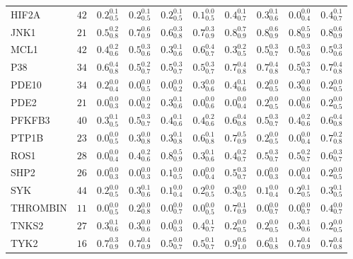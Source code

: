 \begin{tabular}{llllllllll}
HIF2A       &   $42$ &  $0.2^{0.1}_{0.5}$ &  $0.2^{0.1}_{0.5}$ &  $0.2^{0.1}_{0.5}$ &  $0.1^{0.0}_{0.5}$ &  $0.4^{0.1}_{0.7}$ &  $0.3^{0.1}_{0.6}$ &     $0.0^{0.0}_{0.4}$ &  $0.4^{0.1}_{0.7}$ \\
JNK1        &   $21$ &  $0.5^{0.2}_{0.8}$ &  $0.7^{0.6}_{0.9}$ &  $0.6^{0.3}_{0.8}$ &  $0.7^{0.3}_{0.9}$ &  $0.8^{0.7}_{0.9}$ &  $0.8^{0.6}_{0.9}$ &     $0.8^{0.5}_{0.9}$ &  $0.8^{0.6}_{0.9}$ \\
MCL1        &   $42$ &  $0.4^{0.2}_{0.6}$ &  $0.5^{0.3}_{0.6}$ &  $0.3^{0.1}_{0.6}$ &  $0.6^{0.4}_{0.7}$ &  $0.3^{0.2}_{0.5}$ &  $0.5^{0.3}_{0.7}$ &     $0.5^{0.3}_{0.6}$ &  $0.5^{0.3}_{0.6}$ \\
P38         &   $34$ &  $0.6^{0.4}_{0.8}$ &  $0.5^{0.2}_{0.7}$ &  $0.5^{0.3}_{0.7}$ &  $0.5^{0.3}_{0.7}$ &  $0.7^{0.4}_{0.8}$ &  $0.7^{0.4}_{0.8}$ &     $0.5^{0.3}_{0.7}$ &  $0.7^{0.4}_{0.8}$ \\
PDE10       &   $34$ &  $0.2^{0.0}_{0.4}$ &  $0.0^{0.0}_{0.5}$ &  $0.0^{0.0}_{0.2}$ &  $0.3^{0.0}_{0.6}$ &  $0.4^{0.1}_{0.6}$ &  $0.2^{0.0}_{0.5}$ &     $0.3^{0.0}_{0.6}$ &  $0.2^{0.0}_{0.5}$ \\
PDE2        &   $21$ &  $0.0^{0.0}_{0.3}$ &  $0.0^{0.0}_{0.2}$ &  $0.3^{0.1}_{0.6}$ &  $0.0^{0.0}_{0.6}$ &  $0.0^{0.0}_{0.4}$ &  $0.2^{0.0}_{0.5}$ &     $0.0^{0.0}_{0.6}$ &  $0.2^{0.0}_{0.5}$ \\
PFKFB3      &   $40$ &  $0.3^{0.1}_{0.5}$ &  $0.5^{0.3}_{0.7}$ &  $0.4^{0.1}_{0.6}$ &  $0.4^{0.2}_{0.6}$ &  $0.6^{0.4}_{0.8}$ &  $0.5^{0.3}_{0.7}$ &     $0.4^{0.2}_{0.6}$ &  $0.6^{0.4}_{0.8}$ \\
PTP1B       &   $23$ &  $0.0^{0.0}_{0.5}$ &  $0.3^{0.0}_{0.8}$ &  $0.3^{0.1}_{0.8}$ &  $0.6^{0.1}_{0.8}$ &  $0.7^{0.5}_{0.9}$ &  $0.2^{0.0}_{0.5}$ &     $0.0^{0.0}_{0.4}$ &  $0.7^{0.2}_{0.8}$ \\
ROS1        &   $28$ &  $0.0^{0.0}_{0.4}$ &  $0.4^{0.2}_{0.6}$ &  $0.8^{0.5}_{0.9}$ &  $0.3^{0.1}_{0.6}$ &  $0.4^{0.2}_{0.7}$ &  $0.5^{0.3}_{0.7}$ &     $0.5^{0.2}_{0.7}$ &  $0.6^{0.3}_{0.7}$ \\
SHP2        &   $26$ &  $0.0^{0.0}_{0.3}$ &  $0.0^{0.0}_{0.3}$ &  $0.1^{0.0}_{0.5}$ &  $0.0^{0.0}_{0.4}$ &  $0.5^{0.3}_{0.7}$ &  $0.0^{0.0}_{0.3}$ &     $0.0^{0.0}_{0.4}$ &  $0.2^{0.0}_{0.5}$ \\
SYK         &   $44$ &  $0.2^{0.0}_{0.5}$ &  $0.3^{0.1}_{0.6}$ &  $0.1^{0.0}_{0.4}$ &  $0.2^{0.0}_{0.5}$ &  $0.3^{0.0}_{0.5}$ &  $0.1^{0.0}_{0.4}$ &     $0.2^{0.1}_{0.5}$ &  $0.3^{0.1}_{0.5}$ \\
THROMBIN    &   $11$ &  $0.0^{0.0}_{0.5}$ &  $0.2^{0.0}_{0.8}$ &  $0.0^{0.0}_{0.7}$ &  $0.0^{0.0}_{0.5}$ &  $0.7^{0.1}_{0.9}$ &  $0.0^{0.0}_{0.7}$ &     $0.0^{0.0}_{0.7}$ &  $0.4^{0.0}_{0.7}$ \\
TNKS2       &   $27$ &  $0.3^{0.1}_{0.6}$ &  $0.3^{0.0}_{0.6}$ &  $0.0^{0.0}_{0.3}$ &  $0.4^{0.1}_{0.7}$ &  $0.2^{0.0}_{0.5}$ &  $0.2^{0.0}_{0.5}$ &     $0.3^{0.1}_{0.6}$ &  $0.2^{0.0}_{0.5}$ \\
TYK2        &   $16$ &  $0.7^{0.3}_{0.9}$ &  $0.7^{0.4}_{0.9}$ &  $0.5^{0.0}_{0.7}$ &  $0.5^{0.1}_{0.7}$ &  $0.9^{0.6}_{1.0}$ &  $0.6^{0.1}_{0.8}$ &     $0.7^{0.4}_{0.9}$ &  $0.7^{0.4}_{0.8}$ \\
\bottomrule
\end{tabular}

